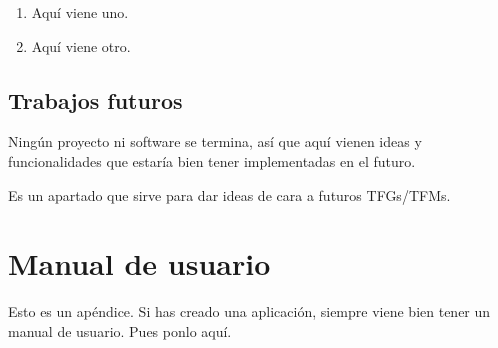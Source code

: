 \documentclass[a4paper, 12pt]{book}
\begin{document}
\begin{enumerate}
  \item Aquí viene uno.
  \item Aquí viene otro.
\end{enumerate}


\section{Trabajos futuros}
\label{sec:trabajos_futuros}

Ningún proyecto ni software se termina, así que aquí vienen ideas y funcionalidades que estaría bien tener implementadas en el futuro.

Es un apartado que sirve para dar ideas de cara a futuros TFGs/TFMs.



\cleardoublepage
\appendix
\chapter{Manual de usuario}
\label{app:manual}

Esto es un apéndice.
Si has creado una aplicación, siempre viene bien tener un manual de usuario.
Pues ponlo aquí.


\cleardoublepage


\end{document}
